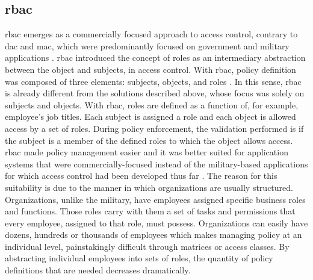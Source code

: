 \subsection{\glsdesc{rbac}}

\glsdesc{rbac} emerges as a commercially focused approach to access control, contrary to \gls{dac} and \gls{mac}, which were predominantly focused on government and military applications \cite{ferraiolo_role-based_1992}. \gls{rbac} introduced the concept of roles as an intermediary abstraction between the object and subjects, in access control. With \gls{rbac}, policy definition was composed of three elements: subjects, objects, and roles \cite{ferraiolo_role-based_1992}. In this sense, \gls{rbac} is already different from the solutions described above, whose focus was solely on subjects and objects. With \gls{rbac}, roles are defined as a function of, for example, employee’s job titles. Each subject is assigned a role and each object is allowed access by a set of roles. During policy enforcement, the validation performed is if the subject is a member of the defined roles to which the object allows access. \gls{rbac} made policy management easier and it was better suited for application systems that were commercially-focused instead of the military-based applications for which access control had been developed thus far \cite{ferraiolo_role-based_1995}. The reason for this suitability is due to the manner in which organizations are usually structured. Organizations, unlike the military, have employees assigned specific business roles and functions. Those roles carry with them a set of tasks and permissions that every employee, assigned to that role, must possess. Organizations can easily have dozens, hundreds or thousands of employees which makes managing policy at an individual level, painstakingly difficult through matrices or access classes. By abstracting individual employees into sets of roles, the quantity of policy definitions that are needed decreases dramatically.


